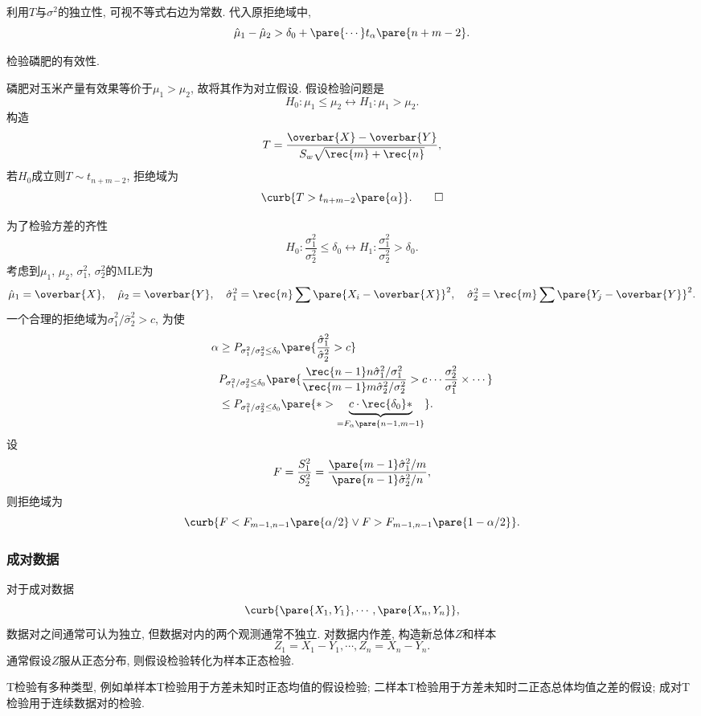 \documentclass[../Statistics.tex]{subfiles}
\begin{document}
利用$T$与$\sigma^2$的独立性, 可视不等式右边为常数. 代入原拒绝域中,
\[ \hat\mu_1 - \hat\mu_2 > \delta_0 + \pare{\cdots} t_\alpha\pare{n+m-2}. \]
\begin{sample}
    \begin{ex}
        检验磷肥的有效性.
    \end{ex}
    \begin{solution}
        磷肥对玉米产量有效果等价于$\mu_1>\mu_2$, 故将其作为对立假设. 假设检验问题是
        \[ H_0: \mu_1 \le \mu_2 \leftrightarrow H_1:\mu_1 > \mu_2. \]
        构造
        \[ T = \frac{\overbar{X} - \overbar{Y}}{S_w \sqrt{\rec{m} + \rec{n}}}, \]
        若$H_0$成立则$T\sim t_{n+m-2}$, 拒绝域为
        \[ \curb{T>t_{n+m-2}\pare{\alpha}}. \qedhere \]
    \end{solution}
\end{sample}
为了检验方差的齐性
\[ H_0: \frac{\sigma_1^2}{\sigma_2^2} \le \delta_0 \leftrightarrow H_1: \frac{\sigma_1^2}{\sigma_2^2} > \delta_0. \]
考虑到$\mu_1$, $\mu_2$, $\sigma_1^2$, $\sigma_2^2$的MLE为
\[ \hat{\mu}_1 = \overbar{X},\quad \hat{\mu}_2 = \overbar{Y},\quad \hat\sigma_1^2 = \rec{n}\sum\pare{X_i - \overbar{X}}^2,\quad \hat{\sigma}_2^2 = \rec{m} \sum\pare{Y_j - \overbar{Y}}^2. \]
一个合理的拒绝域为$\hat\sigma_1^2 / \hat\sigma_2^2 > c$, 为使
\begin{align*}
    \alpha & \ge P_{\sigma_1^2/\sigma_2^2 \le \delta_0} \pare{\frac{\hat\sigma_1^2}{\hat\sigma_2^2} > c} \\
    & P_{\sigma_1^2/\sigma_2^2 \le \delta_0} \pare{\frac{\rec{n-1}n\hat\sigma_1^2/\sigma_1^2}{\rec{m-1}m\hat\sigma_2^2/\sigma_2^2} > c\cdots \frac{\sigma_2^2}{\sigma_1^2}\times \cdots} \\
    &\le P_{\sigma_1^2/\sigma_2^2\le \delta_0} \pare{* > \underbrace{c\cdot\rec{\delta_0} *}_{=F_\alpha\pare{n-1,m-1}}}.
\end{align*}
设
\[ F = \frac{S_1^2}{S_2^2} = \frac{\pare{m-1}\hat\sigma_1^2 /m}{\pare{n-1}\hat\sigma_2^2 /n}, \]
则拒绝域为
\[ \curb{F < F_{m-1,n-1}\pare{\alpha/2}\lor F>F_{m-1,n-1}\pare{1-\alpha/2}}. \]


\subsubsection{成对数据} %
\label{ssub:成对数据}

对于成对数据
\[ \curb{\pare{X_1,Y_1},\cdots,\pare{X_n,Y_n}}, \]
数据对之间通常可认为独立, 但数据对内的两个观测通常不独立. 对数据内作差, 构造新总体$Z$和样本
\[ Z_1 = X_1 - Y_1,\cdots,Z_n = X_n - Y_n. \]
通常假设$Z$服从正态分布, 则假设检验转化为样本正态检验.
\begin{remark}
    T检验有多种类型, 例如单样本T检验用于方差未知时正态均值的假设检验; 二样本T检验用于方差未知时二正态总体均值之差的假设; 成对T检验用于连续数据对的检验.
\end{remark}
\end{document}
